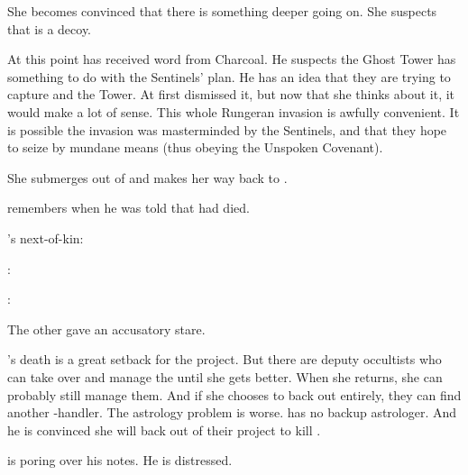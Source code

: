 She becomes convinced that there is something deeper going on. 
She suspects that \Malcur is a decoy. 

At this point \Achsah has received word from Charcoal. 
He suspects the Ghost Tower has something to do with the Sentinels' plan. 
He has an idea that they are trying to capture \Forklin and the Tower. 
At first \Achsah dismissed it, but now that she thinks about it, it would make a lot of sense. 
This whole Rungeran invasion is awfully convenient. 
It is possible the invasion was masterminded by the Sentinels, and that they hope to seize \Forklin by mundane means (thus obeying the Unspoken Covenant). 

She submerges out of \Azmith and makes her way back to \Nyx. 









\begin{comment}
  \section{Teshrial stressed}
\end{comment}
\new 
\Teshrial remembers when he was told that \Urizeth had died. 

\Urizeth's next-of-kin: 

\Teshrial: 


\Teshrial: 

The other \resphan gave \Teshrial an accusatory stare. 

\Urizeth's death is a great setback for the \Malcur project.
But there are deputy occultists who can take over and manage the \noggyaleth until she gets better.
When she returns, she can probably still manage them.
And if she chooses to back out entirely, they can find another \noggyal-handler.
The astrology problem is worse.
\Teshrial has no backup astrologer.
And he is convinced she will back out of their project to kill \Ishnaruchaefir.

\Teshrial is poring over his notes. 
He is distressed. 

